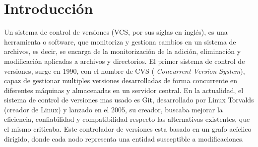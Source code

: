 \chapter{Introducción\label{01intro}}






Un sistema de control de versiones (VCS, por sus siglas en inglés), es una
herramienta o software, que monitoriza y gestiona cambios en un sistema de
archivos, es decir, se encarga de la monitorización de la adición,
eliminación y modificación aplicadas a archivos y directorios. El primer
sistema de control de versiones, surge en 1990, con el nombre de CVS ({\em
  Concurrent Version System}), capaz de gestionar multiples versiones
desarrolladas de forma concurrente en diferentes máquinas y almacenadas en
un servidor central. En la actualidad, el sistema de control de versiones
mas usado es Git\cite{git}, desarrollado por Linux Torvalds (creador de
Linux) y lanzado en el 2005, su creador, buscaba mejorar la eficiencia,
confiabilidad y compatibilidad respecto las alternativas existentes, que el
mismo criticaba. Este controlador de versiones esta basado en un grafo
acíclico dirigido, donde cada nodo representa una entidad susceptible a
modificaciones.

